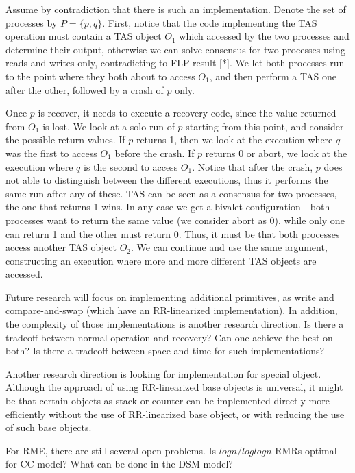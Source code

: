 \documentclass[11pt]{article}
\begin{document}
Assume by contradiction that there is such an implementation. Denote the set of processes by $P=\{p,q\}$. First, notice that the code implementing the TAS operation must contain a TAS object $O_1$ which accessed by the two processes and determine their output, otherwise we can solve consensus for two processes using reads and writes only, contradicting to FLP result [*]. We let both processes run to the point where they both about to access $O_1$, and then perform a TAS one after the other, followed by a crash of $p$ only.

Once $p$ is recover, it needs to execute a recovery code, since the value returned from $O_1$ is lost. We look at a solo run of $p$ starting from this point, and consider the possible return values. If $p$ returns 1, then we look at the execution where $q$ was the first to access $O_1$ before the crash. If $p$ returns 0 or abort, we look at the execution where $q$ is the second to access $O_1$. Notice that after the crash, $p$ does not able to distinguish between the different executions, thus it performs the same run after any of these. TAS can be seen as a consensus for two processes, the one that returns 1 wins. In any case we get a bivalet configuration - both processes want to return the same value (we consider abort as 0), while only one can return 1 and the other must return 0. Thus, it must be that both processes access another TAS object $O_2$. We can continue and use the same argument, constructing an execution where more and more different TAS objects are accessed.

Future research will focus on implementing additional primitives, as write and compare-and-swap (which have an RR-linearized implementation). In addition, the complexity of those implementations is another research direction. Is there a tradeoff between normal operation and recovery? Can one achieve the best on both? Is there a tradeoff between space and time for such implementations?

Another research direction is looking for implementation for special object. Although the approach of using RR-linearized base objects is universal, it might be that certain objects as stack or counter can be implemented directly more efficiently without the use of RR-linearized base object, or with reducing the use of such base objects.

For RME, there are still several open problems. Is $log n / loglog n$ RMRs optimal for CC model? What can be done in the DSM model?
\end{document}
